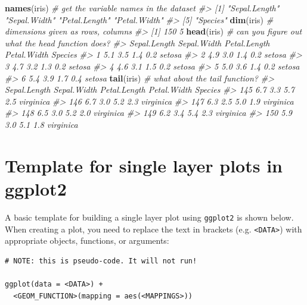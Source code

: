 \documentclass[]{book}
\newenvironment{Shaded}{\begin{snugshade}}{\end{snugshade}}
\newcommand{\CommentTok}[1]{\textcolor[rgb]{0.56,0.35,0.01}{\textit{#1}}}
\newcommand{\KeywordTok}[1]{\textcolor[rgb]{0.13,0.29,0.53}{\textbf{#1}}}
\newcommand{\NormalTok}[1]{#1}
\theoremstyle{definition}
\theoremstyle{definition}
\theoremstyle{definition}
\theoremstyle{remark}
\begin{document}
\begin{Shaded}
\begin{Highlighting}[]
\KeywordTok{names}\NormalTok{(iris) }\CommentTok{# get the variable names in the dataset}
\CommentTok{#> [1] "Sepal.Length" "Sepal.Width"  "Petal.Length" "Petal.Width" }
\CommentTok{#> [5] "Species"}
\KeywordTok{dim}\NormalTok{(iris)   }\CommentTok{# dimensions given as rows, columns}
\CommentTok{#> [1] 150   5}
\KeywordTok{head}\NormalTok{(iris)  }\CommentTok{# can you figure out what the head function does?}
\CommentTok{#>   Sepal.Length Sepal.Width Petal.Length Petal.Width Species}
\CommentTok{#> 1          5.1         3.5          1.4         0.2  setosa}
\CommentTok{#> 2          4.9         3.0          1.4         0.2  setosa}
\CommentTok{#> 3          4.7         3.2          1.3         0.2  setosa}
\CommentTok{#> 4          4.6         3.1          1.5         0.2  setosa}
\CommentTok{#> 5          5.0         3.6          1.4         0.2  setosa}
\CommentTok{#> 6          5.4         3.9          1.7         0.4  setosa}
\KeywordTok{tail}\NormalTok{(iris)  }\CommentTok{# what about the tail function?}
\CommentTok{#>     Sepal.Length Sepal.Width Petal.Length Petal.Width   Species}
\CommentTok{#> 145          6.7         3.3          5.7         2.5 virginica}
\CommentTok{#> 146          6.7         3.0          5.2         2.3 virginica}
\CommentTok{#> 147          6.3         2.5          5.0         1.9 virginica}
\CommentTok{#> 148          6.5         3.0          5.2         2.0 virginica}
\CommentTok{#> 149          6.2         3.4          5.4         2.3 virginica}
\CommentTok{#> 150          5.9         3.0          5.1         1.8 virginica}
\end{Highlighting}
\end{Shaded}

\hypertarget{template-for-single-layer-plots-in-ggplot2}{%
\section{Template for single layer plots in
ggplot2}\label{template-for-single-layer-plots-in-ggplot2}}

A basic template for building a single layer plot using \texttt{ggplot2}
is shown below. When creating a plot, you need to replace the text in
brackets (e.g. \texttt{\textless{}DATA\textgreater{}}) with appropriate
objects, functions, or arguments:

\begin{verbatim}
# NOTE: this is pseudo-code. It will not run!

ggplot(data = <DATA>) + 
  <GEOM_FUNCTION>(mapping = aes(<MAPPINGS>))
\end{verbatim}
\end{document}
